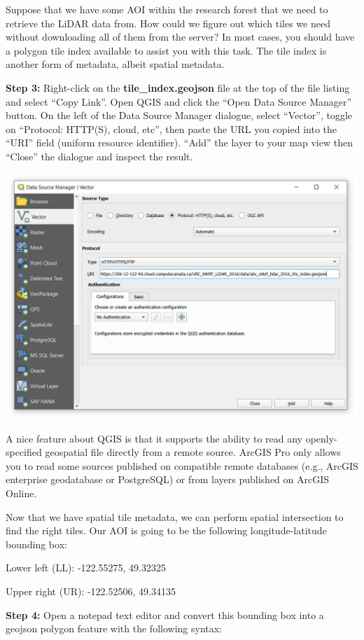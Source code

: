 \documentclass[
]{book}
\begin{document}
Suppose that we have some AOI within the research forest that we need to retrieve the LiDAR data from. How could we figure out which tiles we need without downloading all of them from the server? In most cases, you should have a polygon tile index available to assist you with this task. The tile index is another form of metadata, albeit spatial metadata.

\textbf{Step 3:} Right-click on the \textbf{tile\_index.geojson} file at the top of the file listing and select ``Copy Link''. Open QGIS and click the ``Open Data Source Manager'' button. On the left of the Data Source Manager dialogue, select ``Vector'', toggle on ``Protocol: HTTP(S), cloud, etc'', then paste the URL you copied into the ``URI'' field (uniform resource identifier). ``Add'' the layer to your map view then ``Close'' the dialogue and inspect the result.

\includegraphics[width=0.75\linewidth]{images/01-qgis-data-source-manager-tile-index}

A nice feature about QGIS is that it supports the ability to read any openly-specified geospatial file directly from a remote source. ArcGIS Pro only allows you to read some sources published on compatible remote databases (e.g., ArcGIS enterprise geodatabase or PostgreSQL) or from layers published on ArcGIS Online.

Now that we have spatial tile metadata, we can perform spatial intersection to find the right tiles. Our AOI is going to be the following longitude-latitude bounding box:

Lower left (LL): -122.55275, 49.32325

Upper right (UR): -122.52506, 49.34135

\textbf{Step 4:} Open a notepad text editor and convert this bounding box into a geojson polygon feature with the following syntax:
\end{document}
